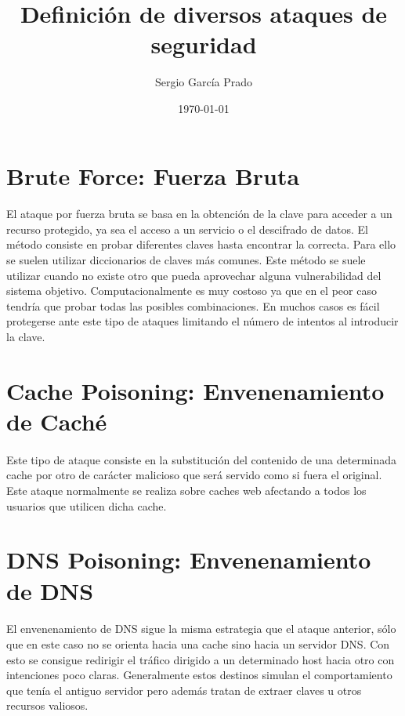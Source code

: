 \documentclass[10pt, a4paper,spanish]{article}
\title{\vspace{-15mm}\fontsize{24pt}{10pt}\selectfont\textbf{Definición de diversos ataques de seguridad}} %
\author{Sergio García Prado}
\date{\today}
\begin{document}
	\maketitle %
	\thispagestyle{fancy} %



    \section{Brute Force: Fuerza Bruta}
        \paragraph{}
		El ataque por fuerza bruta se basa en la obtención de la clave para acceder a un recurso protegido, ya sea el acceso a un servicio o el descifrado de datos. El método consiste en probar diferentes claves hasta encontrar la correcta. Para ello se suelen utilizar diccionarios de claves más comunes. Este método se suele utilizar cuando no existe otro que pueda aprovechar alguna vulnerabilidad del sistema objetivo. Computacionalmente es muy costoso ya que en el peor caso tendría que probar todas las posibles combinaciones. En muchos casos es fácil protegerse ante este tipo de ataques limitando el número de intentos al introducir la clave.


    \section{Cache Poisoning: Envenenamiento de Caché}
        \paragraph{}
		Este tipo de ataque consiste en la substitución del contenido de una determinada cache por otro de carácter malicioso que será servido como si fuera el original. Este ataque normalmente se realiza sobre caches web afectando a todos los usuarios que utilicen dicha cache.


    \section{DNS Poisoning: Envenenamiento de DNS}
        \paragraph{}
		El envenenamiento de DNS sigue la misma estrategia que el ataque anterior, sólo que en este caso no se orienta hacia una cache sino hacia un servidor DNS. Con esto se consigue redirigir el tráfico dirigido a un determinado host hacia otro con intenciones poco claras. Generalmente estos destinos simulan el comportamiento que tenía el antiguo servidor pero además tratan de extraer claves u otros recursos valiosos.
\end{document}
